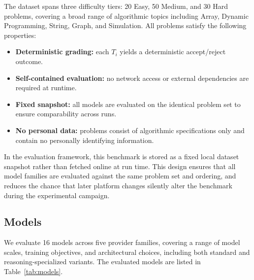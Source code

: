 \documentclass[11pt,a4paper]{article}
\begin{document}
The dataset spans three difficulty tiers: 20 Easy, 50 Medium, and 30 Hard problems, covering a broad range of algorithmic topics including Array, Dynamic Programming, String, Graph, and Simulation. All problems satisfy the following properties:
\begin{itemize}
  \item \textbf{Deterministic grading:} each $T_i$ yields a deterministic accept/reject outcome.
  \item \textbf{Self-contained evaluation:} no network access or external dependencies are required at runtime.
  \item \textbf{Fixed snapshot:} all models are evaluated on the identical problem set to ensure comparability across runs.
  \item \textbf{No personal data:} problems consist of algorithmic specifications only and contain no personally identifying information.
\end{itemize}

In the evaluation framework, this benchmark is stored as a fixed local dataset snapshot rather than fetched online at run time. This design ensures that all model families are evaluated against the same problem set and ordering, and reduces the chance that later platform changes silently alter the benchmark during the experimental campaign.

\subsection{Models}

We evaluate 16 models across five provider families, covering a range of model scales, training objectives, and architectural choices, including both standard and reasoning-specialized variants. The evaluated models are listed in Table~\ref{tab:models}.
\end{document}
